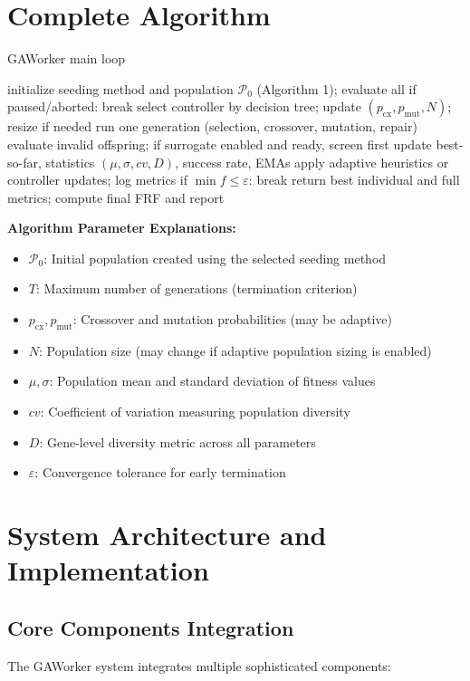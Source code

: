 \documentclass[12pt,a4paper]{article}
\begin{document}
\section{Complete Algorithm}
\begin{algorithm}[H]
\caption{GAWorker main loop}
\begin{algorithmic}[1]
\State initialize seeding method and population $\mathcal{P}_0$ (Algorithm 1); evaluate all
\State if paused/aborted: break
\State select controller by decision tree; update $(p_{\text{cx}},p_{\text{mut}},N)$; resize if needed
\State run one generation (selection, crossover, mutation, repair)
\State evaluate invalid offspring; if surrogate enabled and ready, screen first
\State update best-so-far, statistics $(\mu,\sigma,cv,D)$, success rate, EMAs
\State apply adaptive heuristics or controller updates; log metrics
\State if $\min f \le \varepsilon$: break
\EndFor
\State return best individual and full metrics; compute final FRF and report
\end{algorithmic}
\end{algorithm}

\textbf{Algorithm Parameter Explanations:}
\begin{itemize}
\item $\mathcal{P}_0$: Initial population created using the selected seeding method
\item $T$: Maximum number of generations (termination criterion)
\item $p_{\text{cx}}, p_{\text{mut}}$: Crossover and mutation probabilities (may be adaptive)
\item $N$: Population size (may change if adaptive population sizing is enabled)
\item $\mu, \sigma$: Population mean and standard deviation of fitness values
\item $cv$: Coefficient of variation measuring population diversity
\item $D$: Gene-level diversity metric across all parameters
\item $\varepsilon$: Convergence tolerance for early termination
\end{itemize}


\section{System Architecture and Implementation}

\subsection{Core Components Integration}
The GAWorker system integrates multiple sophisticated components:
\end{document}
